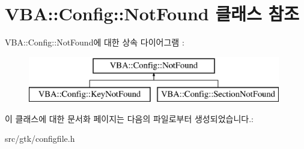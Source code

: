 \hypertarget{class_v_b_a_1_1_config_1_1_not_found}{}\section{V\+BA\+:\+:Config\+:\+:Not\+Found 클래스 참조}
\label{class_v_b_a_1_1_config_1_1_not_found}
V\+BA\+:\+:Config\+:\+:Not\+Found에 대한 상속 다이어그램 \+: \begin{figure}[H]
\begin{center}
\leavevmode
\includegraphics[height=2.000000cm]{class_v_b_a_1_1_config_1_1_not_found}
\end{center}
\end{figure}


이 클래스에 대한 문서화 페이지는 다음의 파일로부터 생성되었습니다.\+:\begin{DoxyCompactItemize}
\item 
src/gtk/configfile.\+h\end{DoxyCompactItemize}
